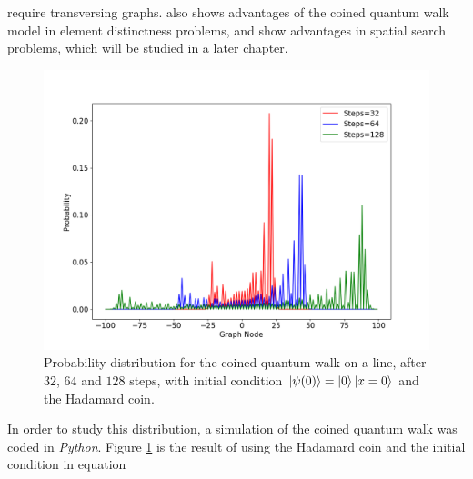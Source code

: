 \documentclass[../../dissertation.tex]{subfiles}
\begin{document}
require transversing graphs. \cite{ambainis2003} also shows advantages of the
coined quantum walk model in element distinctness problems, and
\cite{childs2004} show advantages in spatial search problems, which will be
studied in a later chapter.\par
\begin{figure}[!h]
	\centering
	\includegraphics[scale=0.40]{img/CoinedQuantumWalk/CoinedMultiple_psi0_3264128.png}
	\caption{Probability distribution for the coined quantum walk on a line, after $32$, $64$ and $128$ steps, with initial condition $\ket{\psi(0)}=\ket{0}\ket{x=0}$ and the Hadamard coin.} 
	\label{fig:coinedQWDist0}
\end{figure}
In order to study this distribution, a simulation of the coined quantum walk
was coded in \textit{Python}. Figure \ref{fig:coinedQWDist0} is the result of
using the Hadamard coin and the initial condition in equation
\end{document}
